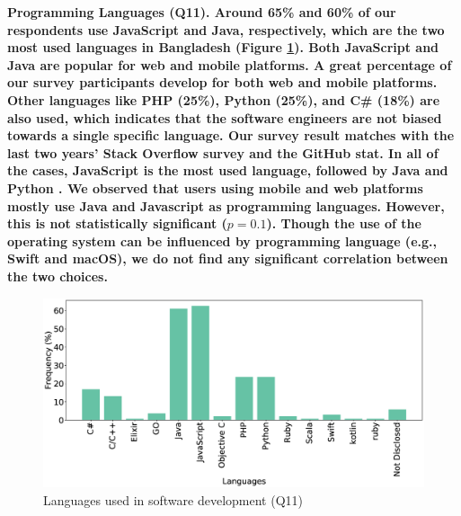 \bf{Programming Languages (Q11).} Around 65\% and 60\% of our respondents use JavaScript and
Java, respectively, which are the two most used languages in Bangladesh (Figure
\ref{fig:languages}). Both JavaScript and Java are popular for web and mobile
platforms. A great percentage of our survey participants develop for both
web and mobile platforms. Other languages
like PHP (25\%), Python (25\%), and C\# (18\%) are also used, which indicates
that the software engineers are not biased towards a single specific language.
Our survey result matches with the last two years' Stack Overflow survey and the
GitHub stat. In all of the cases, JavaScript is the most used language, followed
by Java and Python \citep{StackoverflowSurvey2020, StackoverflowSurvey2019,
GithubStat}. We
observed that users using mobile and web platforms mostly use Java and
Javascript as programming languages. However, this is not statistically
significant ($p=0.1$). Though the use of the operating system can be influenced by
programming language (e.g., Swift and macOS), we do not find any significant correlation
between the two choices.
\begin{figure}[t]
\centering
  \includegraphics[scale=0.18]{Figures/Respondents_languages}
  \caption{Languages used in software development (Q11)}
  \label{fig:languages}
\end{figure}


